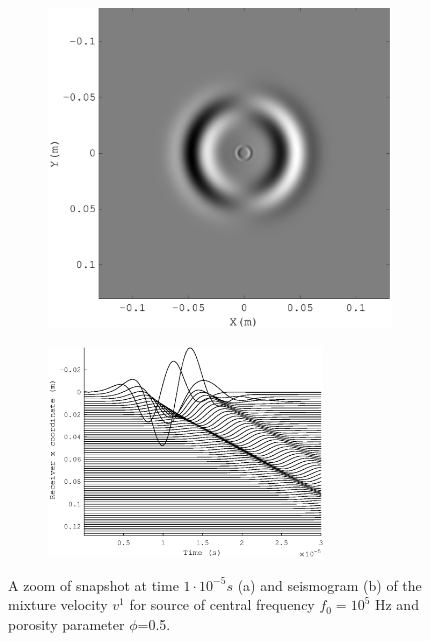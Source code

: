 \documentclass[3p,times,table]{article}
\begin{document}
\begin{figure}%
\begin{subfigure}{0.5\linewidth}
\includegraphics[draft=false,width=1.2\textwidth]{Figures/wave_alfa_s_05_zoom1}
\caption{}
\end{subfigure}
\hfill
\begin{subfigure}{0.5\linewidth}
\includegraphics[draft=false,width=0.8\textwidth]{Figures/alfa_s_05_zoom}
\caption{}
\end{subfigure}%
\caption{A zoom of snapshot at time $1\cdot10^{-5}s$  (a) and seismogram (b) of the mixture 
velocity $v^1$  for source of central frequency $f_{0} =10^{5} $ Hz and 
porosity 
parameter $\phi$=0.5.}
\label{fig:porosity 05 zoom}
\end{figure}
\end{document}
